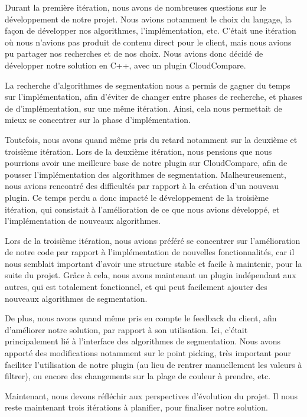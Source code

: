 \documentclass[12pt,titlepage,french]{article}
\begin{document}
Durant la première itération, nous avons de nombreuses questions sur le développement de notre projet. Nous avions notamment le choix du langage, la façon de développer nos algorithmes, l'implémentation, etc. C'était une itération où nous n'avions pas produit de contenu direct pour le client, mais nous avions pu partager nos recherches et de nos choix. Nous avions donc décidé de développer notre solution en C++, avec un plugin CloudCompare.

La recherche d'algorithmes de segmentation nous a permis de gagner du temps sur l'implémentation, afin d'éviter de changer entre phases de recherche, et phases de d'implémentation, sur une même itération. Ainsi, cela nous permettait de mieux se concentrer sur la phase d'implémentation.

Toutefois, nous avons quand même pris du retard notamment sur la deuxième et troisième itération. Lors de la deuxième itération, nous pensions que nous pourrions avoir une meilleure base de notre plugin sur CloudCompare, afin de pousser l'implémentation des algorithmes de segmentation. Malheureusement, nous avions rencontré des difficultés par rapport à la création d'un nouveau plugin. Ce temps perdu a donc impacté le développement de la troisième itération, qui consistait à l'amélioration de ce que nous avions développé, et l'implémentation de nouveaux algorithmes.

Lors de la troisième itération, nous avions préféré se concentrer sur l'amélioration de notre code par rapport à l'implémentation de nouvelles fonctionnalités, car il nous semblait important d'avoir une structure stable et facile à maintenir, pour la suite du projet. Grâce à cela, nous avons maintenant un plugin indépendant aux autres, qui est totalement fonctionnel, et qui peut facilement ajouter des nouveaux algorithmes de segmentation.

De plus, nous avons quand même pris en compte le feedback du client, afin d'améliorer notre solution, par rapport à son utilisation. Ici, c'était principalement lié à l'interface des algorithmes de segmentation. Nous avons apporté des modifications notamment sur le point picking, très important pour faciliter l'utilisation de notre plugin (au lieu de rentrer manuellement les valeurs à filtrer), ou encore des changements sur la plage de couleur à prendre, etc. \newline

Maintenant, nous devons réfléchir aux perspectives d'évolution du projet. Il nous reste maintenant trois itérations à planifier, pour finaliser notre solution. \newline
\end{document}
